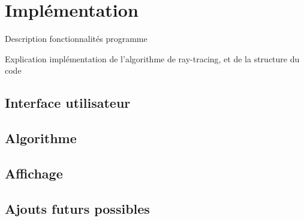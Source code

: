 \chapter{Implémentation}
\label{chaper-2}

Description fonctionnalités programme

Explication implémentation de l'algorithme de ray-tracing, et de la structure du code


\section{Interface utilisateur}


\section{Algorithme}


\section{Affichage}



\section{Ajouts futurs possibles}
